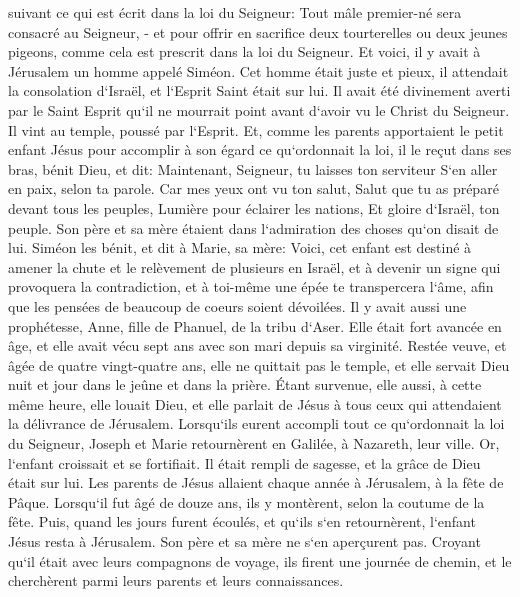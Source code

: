 \verse suivant ce qui est écrit dans la loi du Seigneur: Tout mâle premier-né sera consacré au Seigneur, - 
\verse et pour offrir en sacrifice deux tourterelles ou deux jeunes pigeons, comme cela est prescrit dans la loi du Seigneur. 
\verse Et voici, il y avait à Jérusalem un homme appelé Siméon. Cet homme était juste et pieux, il attendait la consolation d`Israël, et l`Esprit Saint était sur lui. 
\verse Il avait été divinement averti par le Saint Esprit qu`il ne mourrait point avant d`avoir vu le Christ du Seigneur. 
\verse Il vint au temple, poussé par l`Esprit. Et, comme les parents apportaient le petit enfant Jésus pour accomplir à son égard ce qu`ordonnait la loi, 
\verse il le reçut dans ses bras, bénit Dieu, et dit: 
\verse Maintenant, Seigneur, tu laisses ton serviteur S`en aller en paix, selon ta parole. 
\verse Car mes yeux ont vu ton salut, 
\verse Salut que tu as préparé devant tous les peuples, 
\verse Lumière pour éclairer les nations, Et gloire d`Israël, ton peuple. 
\verse Son père et sa mère étaient dans l`admiration des choses qu`on disait de lui. 
\verse Siméon les bénit, et dit à Marie, sa mère: Voici, cet enfant est destiné à amener la chute et le relèvement de plusieurs en Israël, et à devenir un signe qui provoquera la contradiction, 
\verse et à toi-même une épée te transpercera l`âme, afin que les pensées de beaucoup de coeurs soient dévoilées. 
\verse Il y avait aussi une prophétesse, Anne, fille de Phanuel, de la tribu d`Aser. Elle était fort avancée en âge, et elle avait vécu sept ans avec son mari depuis sa virginité. 
\verse Restée veuve, et âgée de quatre vingt-quatre ans, elle ne quittait pas le temple, et elle servait Dieu nuit et jour dans le jeûne et dans la prière. 
\verse Étant survenue, elle aussi, à cette même heure, elle louait Dieu, et elle parlait de Jésus à tous ceux qui attendaient la délivrance de Jérusalem. 
\verse Lorsqu`ils eurent accompli tout ce qu`ordonnait la loi du Seigneur, Joseph et Marie retournèrent en Galilée, à Nazareth, leur ville. 
\verse Or, l`enfant croissait et se fortifiait. Il était rempli de sagesse, et la grâce de Dieu était sur lui. 
\verse Les parents de Jésus allaient chaque année à Jérusalem, à la fête de Pâque. 
\verse Lorsqu`il fut âgé de douze ans, ils y montèrent, selon la coutume de la fête. 
\verse Puis, quand les jours furent écoulés, et qu`ils s`en retournèrent, l`enfant Jésus resta à Jérusalem. Son père et sa mère ne s`en aperçurent pas. 
\verse Croyant qu`il était avec leurs compagnons de voyage, ils firent une journée de chemin, et le cherchèrent parmi leurs parents et leurs connaissances. 
